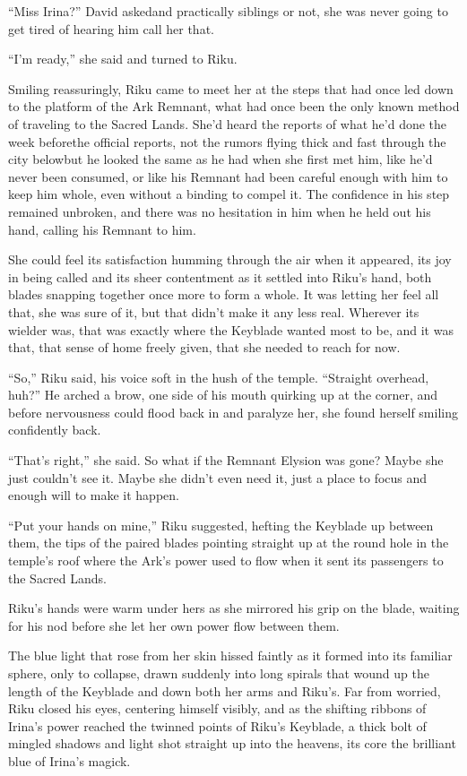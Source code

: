 ``Miss Irina?'' David asked\textemdash and practically siblings or not, she was never going to get tired of hearing him call her that.

``I'm ready,'' she said and turned to Riku.

Smiling reassuringly, Riku came to meet her at the steps that had once led down to the platform of the Ark Remnant, what had once been the only known method of traveling to the Sacred Lands. She'd heard the reports of what he'd done the week before\textemdash the official reports, not the rumors flying thick and fast through the city below\textemdash but he looked the same as he had when she first met him, like he'd never been consumed, or like his Remnant had been careful enough with him to keep him whole, even without a binding to compel it. The confidence in his step remained unbroken, and there was no hesitation in him when he held out his hand, calling his Remnant to him.

She could feel its satisfaction humming through the air when it appeared, its joy in being called and its sheer contentment as it settled into Riku's hand, both blades snapping together once more to form a whole. It was letting her feel all that, she was sure of it, but that didn't make it any less real. Wherever its wielder was, that was exactly where the Keyblade wanted most to be, and it was that, that sense of home freely given, that she needed to reach for now.

``So,'' Riku said, his voice soft in the hush of the temple. ``Straight overhead, huh?'' He arched a brow, one side of his mouth quirking up at the corner, and before nervousness could flood back in and paralyze her, she found herself smiling confidently back.

``That's right,'' she said. So what if the Remnant Elysion was gone? Maybe she just couldn't see it. Maybe she didn't even need it, just a place to focus and enough will to make it happen.

``Put your hands on mine,'' Riku suggested, hefting the Keyblade up between them, the tips of the paired blades pointing straight up at the round hole in the temple's roof where the Ark's power used to flow when it sent its passengers to the Sacred Lands.

Riku's hands were warm under hers as she mirrored his grip on the blade, waiting for his nod before she let her own power flow between them.

The blue light that rose from her skin hissed faintly as it formed into its familiar sphere, only to collapse, drawn suddenly into long spirals that wound up the length of the Keyblade and down both her arms and Riku's. Far from worried, Riku closed his eyes, centering himself visibly, and as the shifting ribbons of Irina's power reached the twinned points of Riku's Keyblade, a thick bolt of mingled shadows and light shot straight up into the heavens, its core the brilliant blue of Irina's magick.

